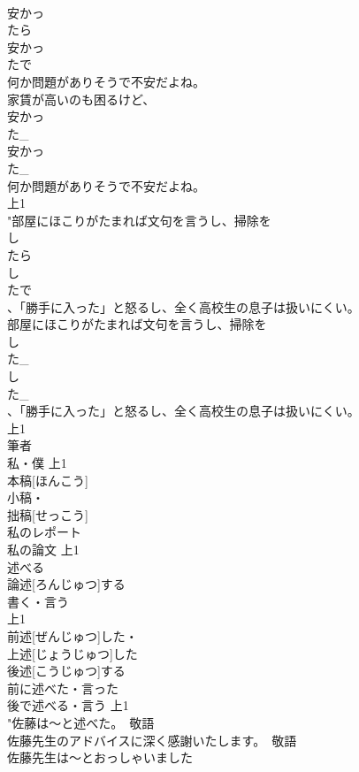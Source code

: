 \documentclass[8pt]{extreport}
\begin{document}
\begin{CJK}{UTF8}{min}
\\	安かっ
\\	たら
\\	安かっ
\\	たで
\\	何か問題がありそうで不安だよね。
\\	家賃が高いのも困るけど、
\\	安かっ
\\	た_
\\	安かっ
\\	た_
\\	何か問題がありそうで不安だよね。
\\	上1
\\	"部屋にほこりがたまれば文句を言うし、掃除を
\\	し
\\	たら
\\	し
\\	たで
\\	、「勝手に入った」と怒るし、全く高校生の息子は扱いにくい。
\\	部屋にほこりがたまれば文句を言うし、掃除を
\\	し
\\	た_
\\	し
\\	た_
\\	、「勝手に入った」と怒るし、全く高校生の息子は扱いにくい。
\\	上1
\\	筆者	
\\	私・僕			上1
\\	本稿[ほんこう]
\\	小稿・
\\	拙稿[せっこう]
\\	私のレポート
\\	私の論文			上1
\\	述べる　
\\	論述[ろんじゅつ]する	
\\	書く・言う
\\	上1
\\	前述[ぜんじゅつ]した・
\\	上述[じょうじゅつ]した
\\	後述[こうじゅつ]する
\\	前に述べた・言った
\\	後で述べる・言う			上1
\\	"佐藤は～と述べた。　敬語
\\	佐藤先生のアドバイスに深く感謝いたします。　敬語
\\	佐藤先生は～とおっしゃいました

\end{CJK}
\end{document}
